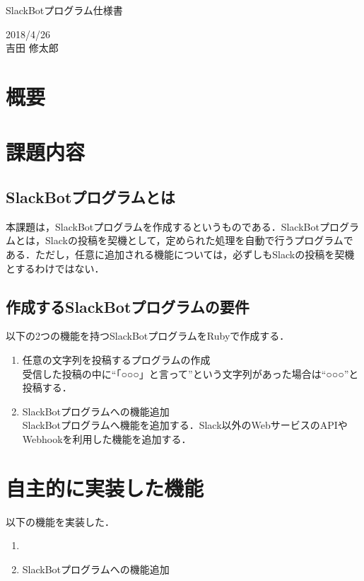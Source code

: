 \documentclass[12pt]{jsarticle}
\begin{document}
\begin{center}
{\LARGE SlackBotプログラム仕様書}
\end{center}

\begin{flushright}
  2018/4/26\\
  吉田 修太郎
\end{flushright}
\section{概要}
\label{sec:introduction}
\section{課題内容}

\subsection{SlackBotプログラムとは}
本課題は，SlackBotプログラムを作成するというものである．SlackBotプログラムとは，Slackの投稿を契機として，定められた処理を自動で行うプログラムである．ただし，任意に追加される機能については，必ずしもSlackの投稿を契機とするわけではない．
\subsection{作成するSlackBotプログラムの要件}
以下の2つの機能を持つSlackBotプログラムをRubyで作成する．
\begin{enumerate}
\item 任意の文字列を投稿するプログラムの作成\\
  受信した投稿の中に``「○○○」と言って''という文字列があった場合は``○○○''と投稿する．
\item SlackBotプログラムへの機能追加\\
  SlackBotプログラムへ機能を追加する．Slack以外のWebサービスのAPIやWebhookを利用した機能を追加する．
\end{enumerate}
\section{自主的に実装した機能}
以下の機能を実装した．
\begin{enumerate}
\item 
\item SlackBotプログラムへの機能追加\\
\end{enumerate}
\end{document}

